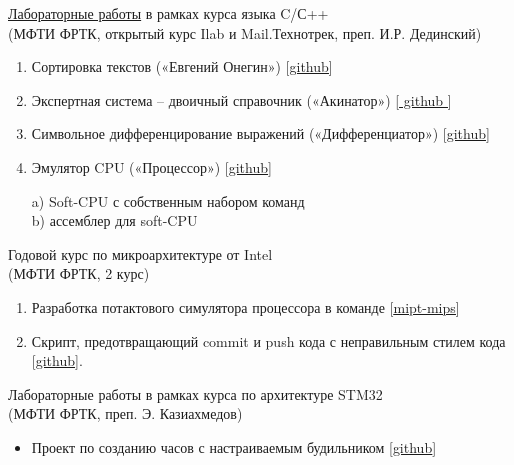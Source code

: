\documentclass[letterpaper]{twentysecondcv} %
\begin{document}
\underline{\href{https://github.com/inedostoev/Ilab-Technotrack}{Лабораторные работы}} в рамках курса языка C/С++ \\
(МФТИ ФРТК, открытый курс Ilab и Mail.Технотрек, преп. И.Р. Дединский)
        \begin{enumerate}
            \item {Сортировка текстов («Евгений Онегин») [\underline{\href{https://github.com/inedostoev/Ilab-Technotrack/tree/master/Technotrack/Sort}{github}}]
            }
            
            \item Экспертная система – двоичный справочник («Акинатор») [\underline{\href{https://github.com/inedostoev/Ilab-Technotrack/tree/master/Technotrack/MIPTakinator}{ github }}]
            
            \item Символьное дифференцирование выражений («Дифференциатор») [\underline{\href{https://github.com/inedostoev/Ilab-Technotrack/tree/master/Technotrack/diff}{github}}]
            
            \item  Эмулятор CPU («Процессор») [\underline{\href{https://github.com/inedostoev/Ilab-Technotrack/tree/master/Technotrack/CPU}{github}}]
            \begin{enumerate}
                a) Soft-CPU с собственным набором команд \\ b) ассемблер для soft-CPU
            \end{enumerate}
        \end{enumerate}
        
Годовой курс по микроархитектуре от Intel \\
(МФТИ ФРТК, 2 курс)
\begin{enumerate}
    \item Разработка потактового симулятора процессора в команде [\underline{\href{https://github.com/MIPT-ILab/mipt-mips}{mipt-mips}}]
    
    \item Скрипт, предотвращающий commit и push кода с неправильным стилем кода [\underline{\href{https://github.com/inedostoev/codeguidelines}{github}}].
\end{enumerate}

Лабораторные работы в рамках курса по архитектуре STM32 \\
(МФТИ ФРТК, преп. Э. Казиахмедов)
\begin{itemize}
    \item Проект по созданию часов с настраиваемым будильником [\underline{\href{https://github.com/inedostoev/STM32f0_ARM/tree/master/TemplateProject}{github}}]
\end{itemize}
\end{document}
